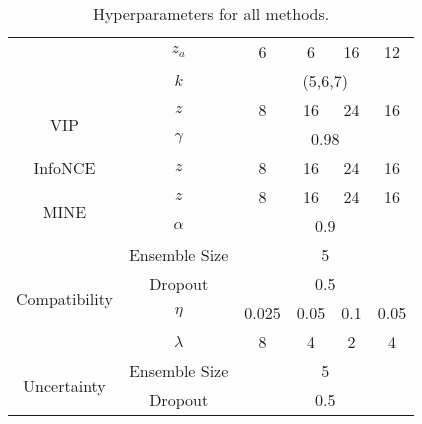 \begin{table*}[ht]
{\begin{tabular}{cccccc}
                               & $z_a$              & 6                        & 6                        & 16              & 12                 \\
                               & $k$                & \multicolumn{4}{c}{(5,6,7)}                                                                \\ \hline
\multirow{2}{*}{VIP}           & $z$                & 8                        & 16                       & 24              & 16                 \\
                               & $\gamma$           & \multicolumn{4}{c}{0.98}                                                                   \\ \hline
InfoNCE                        & $z$                & 8                        & 16                       & 24              & 16                 \\ \hline
\multirow{2}{*}{MINE}          & $z$                & 8                        & 16                       & 24              & 16                 \\
                               & $\alpha$           & \multicolumn{4}{c}{0.9}                                                                    \\ \hline
\multirow{4}{*}{Compatibility} & Ensemble Size      & \multicolumn{4}{c}{5}                                                                      \\
                               & Dropout            & \multicolumn{4}{c}{0.5}                                                                    \\
                               & $\eta$             & 0.025                    & 0.05                     & 0.1             & 0.05               \\
                               & $\lambda$           & 8                        & 4                        & 2               & 4                  \\ \hline
\multirow{2}{*}{Uncertainty}   & Ensemble Size      & \multicolumn{4}{c}{5}                                                                      \\
                               & Dropout            & \multicolumn{4}{c}{0.5}                                                                   
\end{tabular}
}
\caption{Hyperparameters for all methods.}
\label{tab:hyperparameters}
\end{table*}
\vspace{0.05in}

